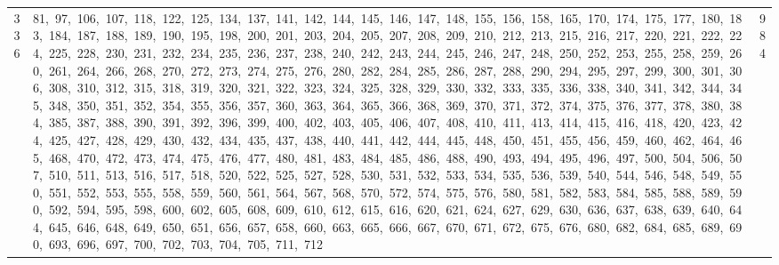 \begin{longtable}{c|p{}|r}
336 & 81,\ 97,\ 106,\ 107,\ 118,\ 122,\ 125,\ 134,\ 137,\ 141,\ 142,\ 144,\ 145,\ 146,\ 147,\ 148,\ 155,\ 156,\ 158,\ 165,\ 170,\ 174,\ 175,\ 177,\ 180,\ 183,\ 184,\ 187,\ 188,\ 189,\ 190,\ 195,\ 198,\ 200,\ 201,\ 203,\ 204,\ 205,\ 207,\ 208,\ 209,\ 210,\ 212,\ 213,\ 215,\ 216,\ 217,\ 220,\ 221,\ 222,\ 224,\ 225,\ 228,\ 230,\ 231,\ 232,\ 234,\ 235,\ 236,\ 237,\ 238,\ 240,\ 242,\ 243,\ 244,\ 245,\ 246,\ 247,\ 248,\ 250,\ 252,\ 253,\ 255,\ 258,\ 259,\ 260,\ 261,\ 264,\ 266,\ 268,\ 270,\ 272,\ 273,\ 274,\ 275,\ 276,\ 280,\ 282,\ 284,\ 285,\ 286,\ 287,\ 288,\ 290,\ 294,\ 295,\ 297,\ 299,\ 300,\ 301,\ 306,\ 308,\ 310,\ 312,\ 315,\ 318,\ 319,\ 320,\ 321,\ 322,\ 323,\ 324,\ 325,\ 328,\ 329,\ 330,\ 332,\ 333,\ 335,\ 336,\ 338,\ 340,\ 341,\ 342,\ 344,\ 345,\ 348,\ 350,\ 351,\ 352,\ 354,\ 355,\ 356,\ 357,\ 360,\ 363,\ 364,\ 365,\ 366,\ 368,\ 369,\ 370,\ 371,\ 372,\ 374,\ 375,\ 376,\ 377,\ 378,\ 380,\ 384,\ 385,\ 387,\ 388,\ 390,\ 391,\ 392,\ 396,\ 399,\ 400,\ 402,\ 403,\ 405,\ 406,\ 407,\ 408,\ 410,\ 411,\ 413,\ 414,\ 415,\ 416,\ 418,\ 420,\ 423,\ 424,\ 425,\ 427,\ 428,\ 429,\ 430,\ 432,\ 434,\ 435,\ 437,\ 438,\ 440,\ 441,\ 442,\ 444,\ 445,\ 448,\ 450,\ 451,\ 455,\ 456,\ 459,\ 460,\ 462,\ 464,\ 465,\ 468,\ 470,\ 472,\ 473,\ 474,\ 475,\ 476,\ 477,\ 480,\ 481,\ 483,\ 484,\ 485,\ 486,\ 488,\ 490,\ 493,\ 494,\ 495,\ 496,\ 497,\ 500,\ 504,\ 506,\ 507,\ 510,\ 511,\ 513,\ 516,\ 517,\ 518,\ 520,\ 522,\ 525,\ 527,\ 528,\ 530,\ 531,\ 532,\ 533,\ 534,\ 535,\ 536,\ 539,\ 540,\ 544,\ 546,\ 548,\ 549,\ 550,\ 551,\ 552,\ 553,\ 555,\ 558,\ 559,\ 560,\ 561,\ 564,\ 567,\ 568,\ 570,\ 572,\ 574,\ 575,\ 576,\ 580,\ 581,\ 582,\ 583,\ 584,\ 585,\ 588,\ 589,\ 590,\ 592,\ 594,\ 595,\ 598,\ 600,\ 602,\ 605,\ 608,\ 609,\ 610,\ 612,\ 615,\ 616,\ 620,\ 621,\ 624,\ 627,\ 629,\ 630,\ 636,\ 637,\ 638,\ 639,\ 640,\ 644,\ 645,\ 646,\ 648,\ 649,\ 650,\ 651,\ 656,\ 657,\ 658,\ 660,\ 663,\ 665,\ 666,\ 667,\ 670,\ 671,\ 672,\ 675,\ 676,\ 680,\ 682,\ 684,\ 685,\ 689,\ 690,\ 693,\ 696,\ 697,\ 700,\ 702,\ 703,\ 704,\ 705,\ 711,\ 712 & 984 \\

\end{longtable}
